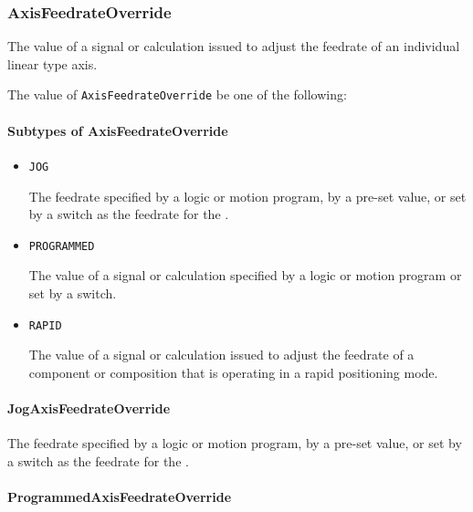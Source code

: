 \FloatBarrier

\subsubsection{AxisFeedrateOverride}
\label{sec:AxisFeedrateOverride}



The value of a signal or calculation issued to adjust the feedrate of an individual linear type axis.


The value of \texttt{AxisFeedrateOverride} \MUST be one of the following: 

\FloatBarrier

\paragraph{Subtypes of AxisFeedrateOverride}\mbox{}
\label{sec:Subtypes of AxisFeedrateOverride}

\begin{itemize}

\item \texttt{JOG}


The feedrate specified by a logic or motion program, by a pre-set value, or set by a switch as the feedrate for the . 

\item \texttt{PROGRAMMED}


The value of a signal or calculation specified by a logic or motion program or set by a switch.

\item \texttt{RAPID}


The value of a signal or calculation issued to adjust the feedrate of a component or composition that is operating in a rapid positioning mode.


\end{itemize}

\paragraph{JogAxisFeedrateOverride}\mbox{}
\label{sec:JogAxisFeedrateOverride}


The feedrate specified by a logic or motion program, by a pre-set value, or set by a switch as the feedrate for the . 


\paragraph{ProgrammedAxisFeedrateOverride}\mbox{}
\label{sec:ProgrammedAxisFeedrateOverride}



